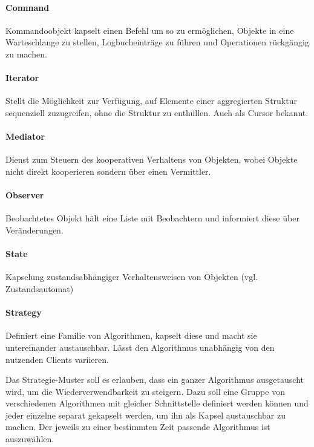 \paragraph{Command}\label{command}

Kommandoobjekt kapselt einen Befehl um so zu ermöglichen, Objekte in eine
Warteschlange zu stellen, Logbucheinträge zu führen und Operationen rückgängig zu
machen.

\paragraph{Iterator}\label{iterator}

Stellt die Möglichkeit zur Verfügung, auf Elemente einer aggregierten Struktur
sequenziell zuzugreifen, ohne die Struktur zu enthüllen. Auch als Cursor
bekannt.

\paragraph{Mediator}\label{mediator}

Dienst zum Steuern des kooperativen Verhaltens von Objekten, wobei Objekte
nicht direkt kooperieren sondern über einen Vermittler.

\paragraph{Observer}\label{observer}

Beobachtetes Objekt hält eine Liste mit Beobachtern und informiert diese über
Veränderungen.

\paragraph{State}\label{state}

Kapselung zustandsabhängiger Verhaltensweisen von Objekten (vgl.
Zustandsautomat)

\paragraph{Strategy}\label{strategy}

Definiert eine Familie von Algorithmen, kapselt diese und macht sie
untereinander austauschbar. Lässt den Algorithmus unabhängig von den nutzenden
Clients variieren.

Das Strategie-Muster soll es erlauben, dass ein ganzer Algorithmus ausgetauscht
wird, um die Wiederverwendbarkeit zu steigern. Dazu soll eine Gruppe von
verschiedenen Algorithmen mit gleicher Schnittstelle definiert werden können und
jeder einzelne separat gekapselt werden, um ihn als Kapsel austauschbar zu
machen. Der jeweils zu einer bestimmten Zeit passende Algorithmus ist
auszuwählen.

